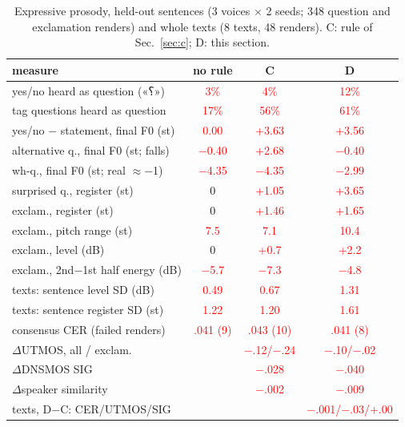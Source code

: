 \documentclass[conference]{IEEEtran}
\newcommand{\fa}[1]{{\persianfont\beginR #1\endR}}
\newcommand{\RES}[1]{\textcolor{red}{#1}}
\begin{document}
\begin{table}[t]
\caption{Expressive prosody, held-out sentences (3 voices $\times$ 2 seeds; 348 question and exclamation
renders) and whole texts (8 texts, 48 renders). C: rule of Sec.~\ref{sec:c}; D: this section.}\label{tab:expr}
\centering
\footnotesize
\setlength{\tabcolsep}{2.2pt}
\begin{tabular}{lccc}
\toprule
measure & no rule & C & D \\
\midrule
yes/no heard as question (\fa{«؟»}) & \RES{3\%} & \RES{4\%} & \RES{12\%} \\
tag questions heard as question & \RES{17\%} & \RES{56\%} & \RES{61\%} \\
yes/no $-$ statement, final F0 (st) & \RES{0.00} & \RES{+3.63} & \RES{+3.56} \\
alternative q., final F0 (st; falls) & \RES{$-$0.40} & \RES{+2.68} & \RES{$-$0.40} \\
wh-q., final F0 (st; real $\approx-$1) & \RES{$-$4.35} & \RES{$-$4.35} & \RES{$-$2.99} \\
surprised q., register (st) & 0 & \RES{+1.05} & \RES{+3.65} \\
exclam., register (st) & 0 & \RES{+1.46} & \RES{+1.65} \\
exclam., pitch range (st) & \RES{7.5} & \RES{7.1} & \RES{10.4} \\
exclam., level (dB) & 0 & \RES{+0.7} & \RES{+2.2} \\
exclam., 2nd$-$1st half energy (dB) & \RES{$-$5.7} & \RES{$-$7.3} & \RES{$-$4.8} \\
texts: sentence level SD (dB) & \RES{0.49} & \RES{0.67} & \RES{1.31} \\
texts: sentence register SD (st) & \RES{1.22} & \RES{1.20} & \RES{1.61} \\
\midrule
consensus CER (failed renders) & \RES{.041 (9)} & \RES{.043 (10)} & \RES{.041 (8)} \\
$\Delta$UTMOS, all / exclam. & & \RES{$-$.12/$-$.24} & \RES{$-$.10/$-$.02} \\
$\Delta$DNSMOS SIG & & \RES{$-$.028} & \RES{$-$.040} \\
$\Delta$speaker similarity & & \RES{$-$.002} & \RES{$-$.009} \\
texts, D$-$C: CER/UTMOS/SIG & & & \RES{$-$.001/$-$.03/+.00} \\
\bottomrule
\end{tabular}
\end{table}
\end{document}
